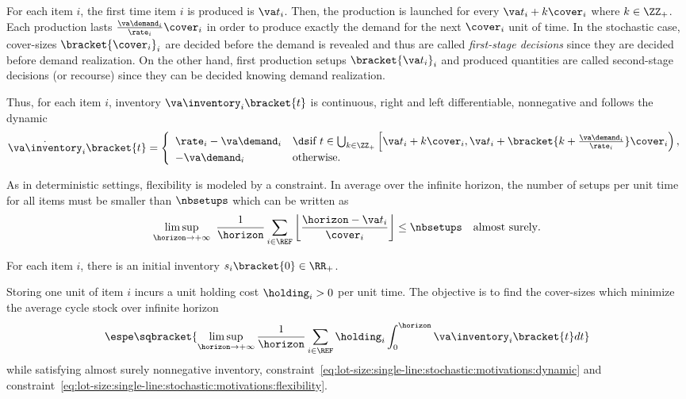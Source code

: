 For each item $i$, the first time item $i$ is produced is $\va t_i$.
Then, the production is launched for every $\va t_i+k\cover_i$ where $k\in\ZZ_+$.
Each production lasts $\frac{\va\demand_i}{\rate_i}\cover_i$ in order to produce exactly the demand for the next $\cover_i$ unit of time.
In the stochastic case, cover-sizes $\bracket{\cover_i}_i$ are decided before the demand is revealed and thus are called \emph{first-stage decisions} since they are decided before demand realization.
On the other hand, first production setups $\bracket{\va t_i}_i$ and produced quantities are called second-stage decisions (or recourse) since they can be decided knowing demand realization.


Thus, for each item $i$, inventory $\va\inventory_i\bracket{t}$ is continuous, right and left differentiable, nonnegative and follows the dynamic
\begin{equation}\label{eq:lot-size:single-line:stochastic:motivations:dynamic}
  \dot{\va\inventory}_i\bracket{t} =
  \left\{
  \begin{array}{ll}
  \rate_i-\va\demand_i
  & \ds\mbox{if}\ t\in\bigcup_{k\in\ZZ_+} \left[\va t_i+k\cover_i,\va t_i+\bracket{k+\frac{\va\demand_i}{\rate_i}}\cover_i\right),
  \\
  -\va\demand_i
  & \mbox{otherwise}.
  \end{array}
  \right.
\end{equation}


As in deterministic settings, flexibility is modeled by a constraint.
In average over the infinite horizon, the number of setups per unit time for all items must be smaller than $\nbsetups$ which can be written as
\begin{equation}\label{eq:lot-size:single-line:stochastic:motivations:flexibility}
  \limsup_{\horizon\rightarrow+\infty}\ \frac{1}{\horizon} \sum_{i\in\REF} \left\lfloor\frac{\horizon-\va t_i}{\cover_i}\right\rfloor \le \nbsetups \quad \mbox{almost surely}.
\end{equation}


For each item $i$, there is an initial inventory $s_i\bracket{0}\in\RR_+$.


Storing one unit of item $i$ incurs a unit holding cost $\holding_i>0$ per unit time.
The objective is to find the cover-sizes which minimize the average cycle stock over infinite horizon
\begin{equation}
  \espe\sqbracket{
  \limsup_{\horizon\rightarrow+\infty}
  \frac{1}{\horizon} \sum_{i\in\REF} \holding_i \int_0^{\horizon}\va\inventory_i\bracket{t}dt
  }
\end{equation}
while satisfying almost surely nonnegative inventory, constraint~\eqref{eq:lot-size:single-line:stochastic:motivations:dynamic} and constraint~\eqref{eq:lot-size:single-line:stochastic:motivations:flexibility}.



